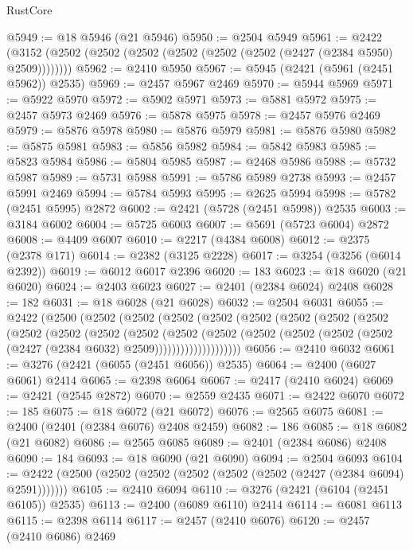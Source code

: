 \begin{lexlean}{RustCore}
\begin{coremodule}
@5949 := @18 @5946 (@21 @5946)
@5950 := @2504 @5949
@5961 := @2422 (@3152 (@2502 (@2502 (@2502 (@2502 (@2502 (@2502 (@2427 (@2384 @5950) @2509))))))))
@5962 := @2410 @5950
@5967 := @5945 (@2421 (@5961 (@2451 @5962)) @2535)
@5969 := @2457 @5967 @2469
@5970 := @5944 @5969
@5971 := @5922 @5970
@5972 := @5902 @5971
@5973 := @5881 @5972
@5975 := @2457 @5973 @2469
@5976 := @5878 @5975
@5978 := @2457 @5976 @2469
@5979 := @5876 @5978
@5980 := @5876 @5979
@5981 := @5876 @5980
@5982 := @5875 @5981
@5983 := @5856 @5982
@5984 := @5842 @5983
@5985 := @5823 @5984
@5986 := @5804 @5985
@5987 := @2468 @5986
@5988 := @5732 @5987
@5989 := @5731 @5988
@5991 := @5786 @5989 @2738
@5993 := @2457 @5991 @2469
@5994 := @5784 @5993
@5995 := @2625 @5994
@5998 := @5782 (@2451 @5995) @2872
@6002 := @2421 (@5728 (@2451 @5998)) @2535
@6003 := @3184 @6002
@6004 := @5725 @6003
@6007 := @5691 (@5723 @6004) @2872
@6008 := @4409 @6007
@6010 := @2217 (@4384 @6008)
@6012 := @2375 (@2378 @171)
@6014 := @2382 (@3125 @2228)
@6017 := @3254 (@3256 (@6014 @2392))
@6019 := @6012 @6017 @2396
@6020 := 183
@6023 := @18 @6020 (@21 @6020)
@6024 := @2403 @6023
@6027 := @2401 (@2384 @6024) @2408
@6028 := 182
@6031 := @18 @6028 (@21 @6028)
@6032 := @2504 @6031
@6055 := @2422
    (@2500
      (@2502
        (@2502
          (@2502
            (@2502
              (@2502
                (@2502
                  (@2502
                    (@2502
                      (@2502
                        (@2502
                          (@2502
                            (@2502
                              (@2502
                                (@2502
                                  (@2502
                                    (@2502
                                      (@2502 (@2502 (@2427 (@2384 @6032) @2509))))))))))))))))))))
@6056 := @2410 @6032
@6061 := @3276 (@2421 (@6055 (@2451 @6056)) @2535)
@6064 := @2400 (@6027 @6061) @2414
@6065 := @2398 @6064
@6067 := @2417 (@2410 @6024)
@6069 := @2421 (@2545 @2872)
@6070 := @2559 @2435
@6071 := @2422 @6070
@6072 := 185
@6075 := @18 @6072 (@21 @6072)
@6076 := @2565 @6075
@6081 := @2400 (@2401 (@2384 @6076) @2408 @2459)
@6082 := 186
@6085 := @18 @6082 (@21 @6082)
@6086 := @2565 @6085
@6089 := @2401 (@2384 @6086) @2408
@6090 := 184
@6093 := @18 @6090 (@21 @6090)
@6094 := @2504 @6093
@6104 := @2422 (@2500 (@2502 (@2502 (@2502 (@2502 (@2502 (@2427 (@2384 @6094) @2591)))))))
@6105 := @2410 @6094
@6110 := @3276 (@2421 (@6104 (@2451 @6105)) @2535)
@6113 := @2400 (@6089 @6110) @2414
@6114 := @6081 @6113
@6115 := @2398 @6114
@6117 := @2457 (@2410 @6076)
@6120 := @2457 (@2410 @6086) @2469

\end{coremodule}
\end{lexlean}
